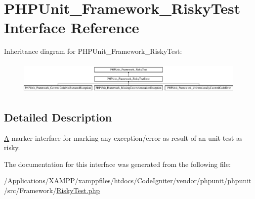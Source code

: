 \hypertarget{interface_p_h_p_unit___framework___risky_test}{}\section{P\+H\+P\+Unit\+\_\+\+Framework\+\_\+\+Risky\+Test Interface Reference}
\label{interface_p_h_p_unit___framework___risky_test}
Inheritance diagram for P\+H\+P\+Unit\+\_\+\+Framework\+\_\+\+Risky\+Test\+:\begin{figure}[H]
\begin{center}
\leavevmode
\includegraphics[height=1.609195cm]{interface_p_h_p_unit___framework___risky_test}
\end{center}
\end{figure}


\subsection{Detailed Description}
\mbox{\hyperlink{class_a}{A}} marker interface for marking any exception/error as result of an unit test as risky. 

The documentation for this interface was generated from the following file\+:\begin{DoxyCompactItemize}
\item 
/\+Applications/\+X\+A\+M\+P\+P/xamppfiles/htdocs/\+Code\+Igniter/vendor/phpunit/phpunit/src/\+Framework/\mbox{\hyperlink{_risky_test_8php}{Risky\+Test.\+php}}\end{DoxyCompactItemize}
